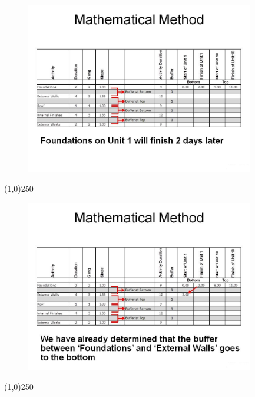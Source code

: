 \begin{frame}
\begin{figure}
	\centering
		\includegraphics[width = 10.0cm]{oldnotes/Slide284.jpg}
\end{figure}
\end{frame}
\begin{center}\line(1,0){250}\end{center}






\begin{frame}
\begin{figure}
	\centering
		\includegraphics[width = 10.0cm]{oldnotes/Slide285.jpg}
\end{figure}
\end{frame}
\begin{center}\line(1,0){250}\end{center}






